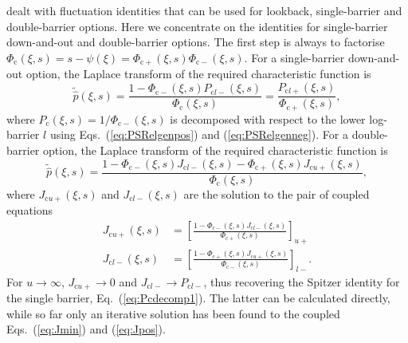 \documentclass[11pt,a4paper]{article}
\begin{document}
\cite{Green2010} dealt with fluctuation identities that can be used for lookback, single-barrier and double-barrier options. Here we concentrate on the identities for single-barrier down-and-out and double-barrier options. The first step is always to factorise $\Phi_\mathrm{c}(\xi,s)=s-\psi(\xi)=\Phi_{\mathrm{c}+}(\xi,s)\Phi_{\mathrm{c}-}(\xi,s)$. For a single-barrier down-and-out option, the Laplace transform of the required characteristic function is
\begin{equation}
\label{eq:Pcdecomp1}
\widetilde{\widehat{p}}(\xi,s) =\frac{1-\Phi_{\mathrm{c}-}(\xi,s)P_{\mathrm{c}l-}(\xi,s)}{\Phi_{\mathrm{c}}(\xi,s)} =\frac{P_{\mathrm{c}l+}(\xi,s)}{\Phi_{\mathrm{c}+}(\xi,s)},
\end{equation}
where $P_{\mathrm{c}}(\xi,s) = 1/\Phi_{\mathrm{c}-}(\xi,s)$ is decomposed with respect to the lower log-barrier $l$ using Eqs.~(\ref{eq:PSRelgenpos}) and (\ref{eq:PSRelgenneg}).
For a double-barrier option, the Laplace transform of the required characteristic function is
\begin{equation}
\label{eq:Doubcpdf}
\widetilde{\widehat{p}}(\xi,s)=\frac{1-\Phi_{\mathrm{c}-}(\xi,s)J_{\mathrm{c}l-}(\xi,s)-\Phi_{\mathrm{c}+}(\xi,s)J_{\mathrm{c}u+}(\xi,s)}{\Phi_\mathrm{c}(\xi,s)},
\end{equation}
where $J_{\mathrm{c}u+}(\xi,s)$ and $J_{\mathrm{c}l-}(\xi,s)$ are the solution to the pair of coupled equations
\begin{align}
J_{\mathrm{c}u+}(\xi,s)&=\left[\frac{1-\Phi_{\mathrm{c}-}(\xi,s)J_{\mathrm{c}l-}(\xi,s)}{\Phi_{\mathrm{c}+}(\xi,s)}\right]_{u+}\label{eq:Jmin} \\
J_{\mathrm{c}l-}(\xi,s)&=\left[\frac{1-\Phi_{\mathrm{c}+}(\xi,s)J_{\mathrm{c}u+}(\xi,s)}{\Phi_{\mathrm{c}-}(\xi,s)}\right]_{l-}.\label{eq:Jpos}
\end{align}
\noindent For $u\to\infty$, $J_{\mathrm{c}u+}\to 0$ and $J_{\mathrm{c}l-}\to P_{\mathrm{c}l-}$, thus recovering the Spitzer identity for the single barrier, Eq.~(\ref{eq:Pcdecomp1}). The latter can be calculated directly, while so far only an iterative solution has been found \citep{Fusai2016,Phelan2017} to the coupled Eqs.~(\ref{eq:Jmin}) and (\ref{eq:Jpos}).
\end{document}
